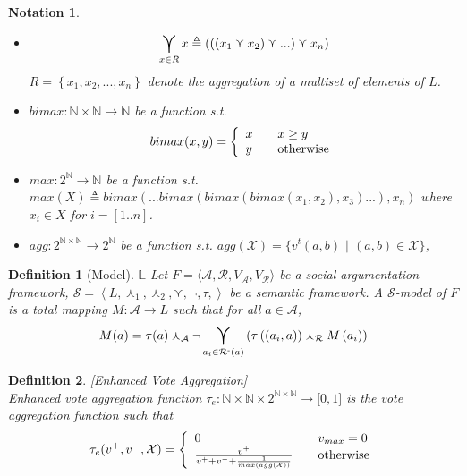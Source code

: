 \documentclass{article}
\newtheorem{definition}{Definition}
\newtheorem{notation}{Notation}
\newcommand{\nat}{\mathbb{N}}   %
\newcommand{\args}{\mathcal{A}} %
\newcommand{\att}{\mathcal{R}}  %
\newcommand{\valueset}{L}
\newcommand{\varg}{V_{\args}}   %
\newcommand{\vatt}{V_{\att}}   %
\newcommand{\attackers}[1]{\att^\text{-}\left(#1\right)}
\newcommand{\safid}{F}               %
\newcommand{\saf}{\safid = \safbody} %
\newcommand{\safbody}{\langle \args, \att, \varg, \vatt \rangle} %
\newcommand{\semid}{\mathcal{S}}        %
\newcommand{\sembodyNew}{\left\langle \valueset,\SAFand_1, \SAFand_2,\SAFor,\lnot,\tau, \right\rangle} %
\newcommand{\SAFand}{\curlywedge}     %
\newcommand{\SAFor}{\curlyvee}        %
\DeclareMathOperator*{\SAFOr}{\bigcurlyvee} %
\newcommand{\sem}{\mathcal{S}}
\begin{document}
\begin{notation}
\begin{itemize}
\item$$\SAFOr_{x \in R} x \triangleq\left(\left(\left(  x_{1}\SAFor x_{2}\right) \SAFor...\right)\SAFor x_{n}\right)$$ $R=\left\{  x_{1},x_{2},...,x_{n}\right\}$ denote the aggregation of a multiset of elements of $\valueset$. 
\item $bimax: \nat \times \nat \to \nat$ be a function s.t.
\[ bimax (x, y)  = \left\{
\begin{array}
[c]{lll}
x &  & x \geq y\\
y &  & \text{otherwise}%
\end{array}
\right. \]

\item $max: 2^{\nat} \to \nat$ be a function s.t. \\$max(X) \triangleq bimax(...bimax(bimax(bimax(x_1, x_2), x_3)...), x_n)$ where $x_{i} \in X$ for $i = [1..n]$.

\item $agg:  2^{\nat \times \nat} \to 2^{\nat}$ be a function s.t. $agg(\mathcal{X}) = \{v^t(a, b)$ $|$ $(a, b) \in \mathcal{X}\}$,

\end{itemize}
\end{notation}

\begin{definition}[Model] $\mathbb{L}$
\label{def:model}
  Let $\saf$ be a social argumentation framework, $\sem = \sembodyNew$ be a semantic framework. A $\semid$-model of $\safid$ is a total mapping $M : \args \rightarrow \valueset$ such that for all $a \in \args$,
  $$\displaystyle M(a) = \tau(a) \SAFand_\args \lnot \SAFOr_{a_i \in \attackers{a}} \left(\tau\left((a_i, a)\right) \SAFand_\att M\left(a_i\right)\right)$$
\end{definition}


\begin{definition}
\label{def:enhVoteAgg}
[Enhanced Vote Aggregation]
\\ Enhanced vote aggregation function
$\tau_{e}:\nat \times \nat \times {2}^{\nat \times \nat} \rightarrow\lbrack0,1]$ is the vote aggregation function such that
\[
\tau_{e}  (v^{+},v^{-}, \mathcal{X})  = \left\{
\begin{array}
[c]{lll}
0 &  & v_{max}=0\\
\frac{v^{+}}{v^{+}+v^{-}+\frac{1}{max(agg(\mathcal{X}))}} &  & \text{otherwise}%
\end{array}
\right.
\]
\end{definition}
\end{document}
